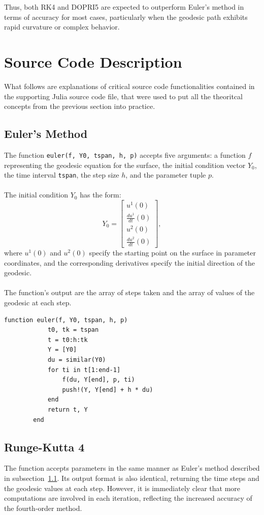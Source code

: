 \documentclass{article}
\begin{document}
	Thus, both RK4 and DOPRI5 are expected to outperform Euler's method in terms of accuracy for most cases, particularly when the geodesic path exhibits rapid curvature or complex behavior.
	\newpage
	\section{Source Code Description}
	What follows are explanations of critical source code functionalities contained in the supporting Julia source code file, that were used to put all the theoritcal concepts from the previous section into practice.

	\subsection{Euler’s Method}\label{subsec:euler}
	The function \texttt{euler(f, Y0, tspan, h, p)} accepts five arguments: a function $f$ representing the geodesic equation for the surface, the initial condition vector $Y_0$, the time interval \texttt{tspan}, the step size $h$, and the parameter tuple $p$.
	\\\\
	The initial condition $Y_0$ has the form:
	\[
	Y_0 = \begin{bmatrix}
		u^1(0) \\
		\frac{du^1}{dt}(0) \\
		u^2(0) \\
		\frac{du^2}{dt}(0)
	\end{bmatrix},
	\]
	where $u^1(0)$ and $u^2(0)$ specify the starting point on the surface in parameter coordinates, and the corresponding derivatives specify the initial direction of the geodesic.
	\\\\
	The function's output are the array of steps taken and the array of values of the geodesic at each step.
	\begin{lstlisting}[style=juliasnippet, caption={Euler's method in Julia}]
		function euler(f, Y0, tspan, h, p)
			t0, tk = tspan
			t = t0:h:tk
			Y = [Y0]
			du = similar(Y0) 
			for ti in t[1:end-1]
				f(du, Y[end], p, ti)
				push!(Y, Y[end] + h * du)
			end
			return t, Y
		end
	\end{lstlisting}


	\newpage
	\subsection{Runge-Kutta 4}
	
	The function accepts parameters in the same manner as Euler's method described in subsection~\ref{subsec:euler}.
	Its output format is also identical, returning the time steps and the geodesic values at each step.
	However, it is immediately clear that more computations are involved in each iteration, reflecting the increased accuracy of the fourth-order method.
	
\end{document}
